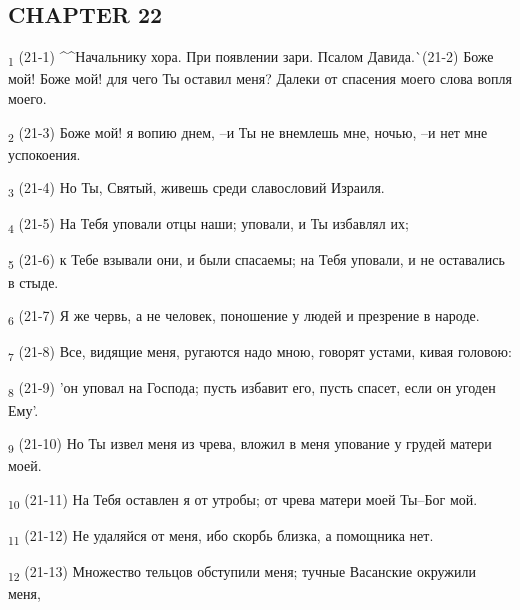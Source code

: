 \subsection{CHAPTER 22}
\begin{tcolorbox}
\textsubscript{1} (21-1) ^^Начальнику хора. При появлении зари. Псалом Давида.^^ (21-2) Боже мой! Боже мой! для чего Ты оставил меня? Далеки от спасения моего слова вопля моего.
\end{tcolorbox}
\begin{tcolorbox}
\textsubscript{2} (21-3) Боже мой! я вопию днем, --и Ты не внемлешь мне, ночью, --и нет мне успокоения.
\end{tcolorbox}
\begin{tcolorbox}
\textsubscript{3} (21-4) Но Ты, Святый, живешь среди славословий Израиля.
\end{tcolorbox}
\begin{tcolorbox}
\textsubscript{4} (21-5) На Тебя уповали отцы наши; уповали, и Ты избавлял их;
\end{tcolorbox}
\begin{tcolorbox}
\textsubscript{5} (21-6) к Тебе взывали они, и были спасаемы; на Тебя уповали, и не оставались в стыде.
\end{tcolorbox}
\begin{tcolorbox}
\textsubscript{6} (21-7) Я же червь, а не человек, поношение у людей и презрение в народе.
\end{tcolorbox}
\begin{tcolorbox}
\textsubscript{7} (21-8) Все, видящие меня, ругаются надо мною, говорят устами, кивая головою:
\end{tcolorbox}
\begin{tcolorbox}
\textsubscript{8} (21-9) 'он уповал на Господа; пусть избавит его, пусть спасет, если он угоден Ему'.
\end{tcolorbox}
\begin{tcolorbox}
\textsubscript{9} (21-10) Но Ты извел меня из чрева, вложил в меня упование у грудей матери моей.
\end{tcolorbox}
\begin{tcolorbox}
\textsubscript{10} (21-11) На Тебя оставлен я от утробы; от чрева матери моей Ты--Бог мой.
\end{tcolorbox}
\begin{tcolorbox}
\textsubscript{11} (21-12) Не удаляйся от меня, ибо скорбь близка, а помощника нет.
\end{tcolorbox}
\begin{tcolorbox}
\textsubscript{12} (21-13) Множество тельцов обступили меня; тучные Васанские окружили меня,
\end{tcolorbox}
